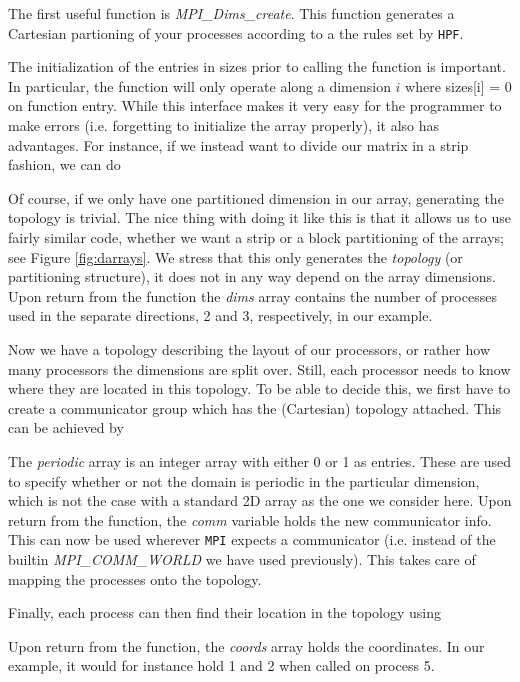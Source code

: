\documentclass[twoside, 11pt, a4paper]{article}
\begin{document}
The first useful function is \emph{MPI\_Dims\_create}. This function generates a 
Cartesian partioning of your processes according to a the rules set by \texttt{HPF}.

The initialization of the entries in sizes prior to calling the function is important.
In particular, the function will only operate along a dimension $i$ where sizes[i] = 0
on function entry. While this interface makes it very easy for the programmer to
make errors (i.e. forgetting to initialize the array properly), it also has advantages.
For instance, if we instead want to divide our matrix in a strip fashion, we can do

Of course, if we only have one partitioned dimension in our array,
generating the topology is trivial. The nice thing with doing it like this is that it
allows us to use fairly similar code, whether we want a strip or a block partitioning of 
the arrays; see Figure \ref{fig:darrays}. We stress that this only generates the
\emph{topology} (or partitioning structure), it does not in any way depend on the array dimensions. 
Upon return from the function the \emph{dims} array contains the number of processes
used in the separate directions, 2 and 3, respectively, in our example.

Now we have a topology describing the layout of our processors, or rather how many
processors the dimensions are split over. Still, each
processor needs to know where they are located in this topology. To be able to decide this,
we first have to create a communicator group which has the (Cartesian) topology attached.
This can be achieved by

The \emph{periodic} array is an integer array with either 0 or 1 as entries. These are used to
specify whether or not the domain is periodic in the particular dimension, which 
is not the case with a standard 2D array as the one we consider here.
Upon return from the function, the \emph{comm} variable holds the new communicator info.
This can now be used wherever \texttt{MPI} expects a communicator (i.e. instead of
the builtin \emph{MPI\_COMM\_WORLD} we have used previously).
This takes care of mapping the processes onto the topology.

Finally, each process can then find their location in the topology using

Upon return from the function, the \emph{coords} array holds the coordinates. In our example,
it would for instance hold 1 and 2 when called on process 5.
\end{document}
